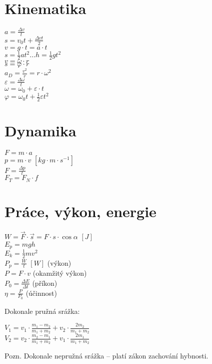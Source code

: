 \documentclass{article}
\begin{document}
\section{Kinematika}
\begin{multicols}{2}
\noindent$a=\frac{\Delta v}{t}$\\
$s=v_0t+\frac{\Delta v t}{2}$\\
$v=g\cdot t=a\cdot t$\\
$s=\frac{1}{2}at^2 \dots h=\frac{1}{2}gt^2$\\
$v=\omega \cdot r$\\
$s=\varphi \cdot r$\\
$a_D=\frac{v^2}{r}=r\cdot\omega^2$\\
$\varepsilon = \frac{\Delta \omega}{t}$\\
$\omega=\omega_0+\varepsilon\cdot t$\\
$\varphi=\omega_0t+\frac{1}{2}\varepsilon t^2$
\end{multicols}

\section{Dynamika}
\begin{multicols}{2}
\noindent $F=m\cdot a$\\
$p=m\cdot v$ $\left[kg\cdot m\cdot s^{-1}\right]$\\
$F=\frac{\Delta p}{t}$\\
$F_T=F_N\cdot f$
\end{multicols}

\section{Práce, výkon, energie}
\begin{multicols}{2}
\noindent $W=\vec{F}\cdot\vec{s}=F\cdot s \cdot \cos{\alpha}$ $[J]$\\
$E_p=mgh$\\
$E_k=\frac{1}{2}mv^2$\\
$P_p=\frac{W}{t}$ $[W]$ (výkon)\\
$P=F\cdot v$ (okamžitý výkon)\\
$P_0=\frac{\Delta E}{\Delta t}$ (příkon)\\
$\eta=\frac{P}{P_0}$ (účinnost)\\
\end{multicols}


\noindent Dokonale pružná srážka:
\begin{multicols}{2}
\noindent $V_1=v_1\cdot \frac{m_1-m_2}{m_1+m_2}+v_2\cdot \frac{2m_2}{m_1+m_2}$\\
$V_2=v_2\cdot \frac{m_2-m_1}{m_1+m_2}+v_1\cdot \frac{2m_1}{m_1+m_2}$
\end{multicols}
\noindent Pozn. Dokonale nepružná srážka -- platí zákon zachování hybnosti.
\end{document}
